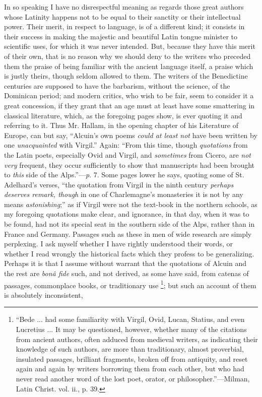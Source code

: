 In so speaking I have no disrespectful meaning as regards those
great authors whose Latinity happens not to be equal to their sanctity
or their intellectual power. Their merit, in respect to language, is
of a different kind; it consists in their success in making the
majestic and beautiful Latin tongue minister to scientific uses, for
which it was never intended. But, because they have this merit of
their own, that is no reason why we should deny to the writers who
preceded them the praise of being familiar with the ancient language
itself, a praise which is justly theirs, though seldom allowed to
them. The writers of the Benedictine centuries are supposed to have
the barbarism, without the science, of the Dominican period; and
modern critics, who wish to be fair, seem to consider it a great
concession, if they grant that an age must at least have some
smattering in classical literature, which, as the foregoing pages
show, is ever quoting it and referring to it. Thus Mr. Hallam, in the
opening chapter of his Literature of Europe, can but say, ``Alcuin's
own poems \emph{could at least not} have been written by one \emph{unacquainted}
with Virgil.'' Again: ``From this time, though \emph{quotations}
from the Latin poets, especially Ovid and Virgil, and \emph{sometimes}
from Cicero, are \emph{not very} frequent, they occur sufficiently to
show that manuscripts had been brought to \emph{this} side of the
Alps.''—\emph{p}. 7. Some pages lower he says, quoting some of St.
Adelhard's verses, ``the quotation from Virgil in the ninth
century \emph{perhaps deserves remark, though} in one of Charlemagne's
monasteries it is not by any means \emph{astonishing};'' as if
Virgil were not the text-book in the northern schools, as my foregoing
quotations make clear, and ignorance, in that day, when it was to be
found, had not its special seat in the southern side of the Alps,
rather than in France and Germany. Passages such as these in men of
wide research are simply perplexing. I ask myself whether I have
rightly understood their words, or whether I read wrongly the
historical facts which they profess to be generalizing. Perhaps it is
that I assume without warrant that the quotations of Alcuin and the
rest are \emph{bonâ fide} such, and not derived, as some have said,
from catenas of passages, commonplace books, or traditionary use \footnote{``Bede
... had some familiarity with Virgil, Ovid, Lucan, Statius, and even
Lucretius ... It may be questioned, however, whether many of the
citations from ancient authors, often adduced from medieval writers,
as indicating their knowledge of such authors, are more than
traditionary, almost proverbial, insulated passages, brilliant
fragments, broken off from antiquity, and reset again and again by
writers borrowing them from each other, but who had never read another
word of the lost poet, orator, or philosopher.''—Milman, Latin
Christ. vol. ii., p. 39.}; but such an account of them is absolutely inconsistent,
